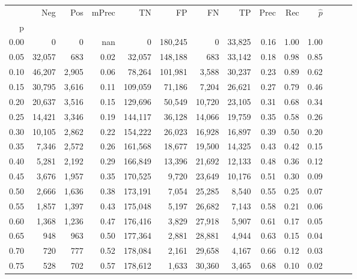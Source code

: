 \begin{tabular}{rrrrrrrrrrrrrr}
\toprule
{} &     Neg &    Pos & mPrec &       TN &       FP &      FN &      TP &  Prec &   Rec & $\hat{p}$ \\
p    &         &        &       &          &          &         &         &       &       &           \\
\midrule
0.00 &       0 &      0 &   nan &        0 &  180,245 &       0 &  33,825 &  0.16 &  1.00 &      1.00 \\
0.05 &  32,057 &    683 &  0.02 &   32,057 &  148,188 &     683 &  33,142 &  0.18 &  0.98 &      0.85 \\
0.10 &  46,207 &  2,905 &  0.06 &   78,264 &  101,981 &   3,588 &  30,237 &  0.23 &  0.89 &      0.62 \\
0.15 &  30,795 &  3,616 &  0.11 &  109,059 &   71,186 &   7,204 &  26,621 &  0.27 &  0.79 &      0.46 \\
0.20 &  20,637 &  3,516 &  0.15 &  129,696 &   50,549 &  10,720 &  23,105 &  0.31 &  0.68 &      0.34 \\
0.25 &  14,421 &  3,346 &  0.19 &  144,117 &   36,128 &  14,066 &  19,759 &  0.35 &  0.58 &      0.26 \\
0.30 &  10,105 &  2,862 &  0.22 &  154,222 &   26,023 &  16,928 &  16,897 &  0.39 &  0.50 &      0.20 \\
0.35 &   7,346 &  2,572 &  0.26 &  161,568 &   18,677 &  19,500 &  14,325 &  0.43 &  0.42 &      0.15 \\
0.40 &   5,281 &  2,192 &  0.29 &  166,849 &   13,396 &  21,692 &  12,133 &  0.48 &  0.36 &      0.12 \\
0.45 &   3,676 &  1,957 &  0.35 &  170,525 &    9,720 &  23,649 &  10,176 &  0.51 &  0.30 &      0.09 \\
0.50 &   2,666 &  1,636 &  0.38 &  173,191 &    7,054 &  25,285 &   8,540 &  0.55 &  0.25 &      0.07 \\
0.55 &   1,857 &  1,397 &  0.43 &  175,048 &    5,197 &  26,682 &   7,143 &  0.58 &  0.21 &      0.06 \\
0.60 &   1,368 &  1,236 &  0.47 &  176,416 &    3,829 &  27,918 &   5,907 &  0.61 &  0.17 &      0.05 \\
0.65 &     948 &    963 &  0.50 &  177,364 &    2,881 &  28,881 &   4,944 &  0.63 &  0.15 &      0.04 \\
0.70 &     720 &    777 &  0.52 &  178,084 &    2,161 &  29,658 &   4,167 &  0.66 &  0.12 &      0.03 \\
0.75 &     528 &    702 &  0.57 &  178,612 &    1,633 &  30,360 &   3,465 &  0.68 &  0.10 &      0.02 \\

\end{tabular}
